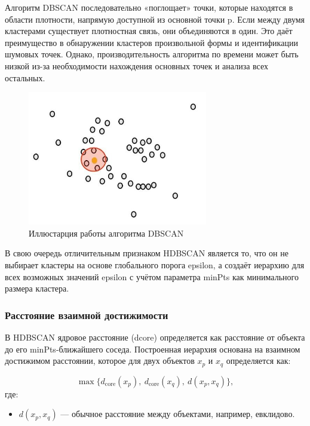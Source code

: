 Алгоритм DBSCAN последовательно «поглощает» точки, которые находятся в области плотности, напрямую доступной из основной точки p. Если между двумя кластерами существует плотностная связь, они объединяются в один. Это даёт преимущество в обнаружении кластеров произвольной формы и идентификации шумовых точек. Однако, производительность алгоритма по времени может быть низкой из-за необходимости нахождения основных точек и анализа всех остальных.
\begin{figure}[h!]
    \centering
    \includegraphics[width=0.7\textwidth]{styles/diploma/inc/dbscan.jpg} %
    \caption{Иллюстарция работы алгоритма DBSCAN}
    \label{fig:example}
\end{figure}

В свою очередь отличительным признаком  HDBSCAN является то, что он не выбирает кластеры на основе глобального порога epsilon, а создаёт иерархию для всех возможных значений epsilon с учётом параметра minPts как минимального размера кластера.
\subsubsection{Расстояние взаимной достижимости}
В HDBSCAN ядровое расстояние (dcore) определяется как расстояние от объекта до его minPts-ближайшего соседа. Построенная иерархия основана на взаимном достижимом расстоянии, которое для двух объектов $x_p$ и $x_q$ определяется как:

\begin{equation}
\max\{d_{\text{core}}(x_p),\ d_{\text{core}}(x_q),\ d(x_p, x_q)\} ,
\end{equation}
где:
\begin{itemize}
\item  $d(x_p, x_q)$ — обычное расстояние между объектами, например, евклидово. 
\end{itemize}


